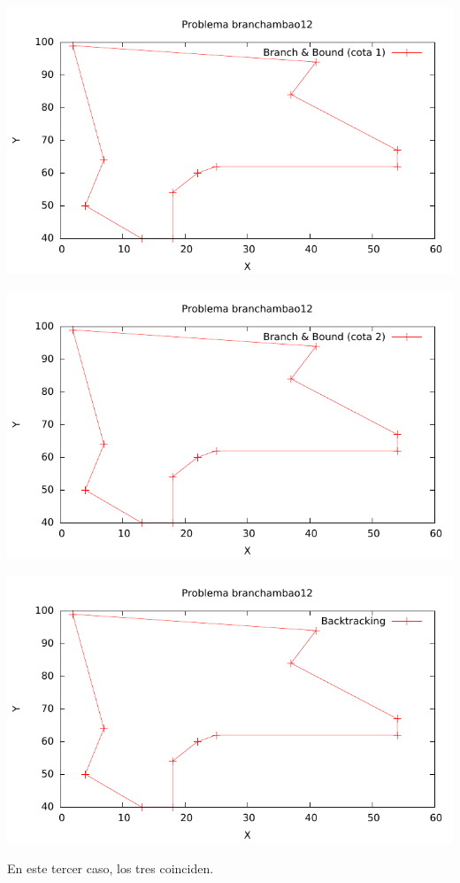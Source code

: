 \includegraphics[width=15cm]{img/branchambao12_tsp_1}

\includegraphics[width=15cm]{img/branchambao12_tsp_2}

\includegraphics[width=15cm]{img/branchambao12_tsp_3}

En este tercer caso, los tres coinciden. \\

